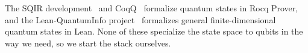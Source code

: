 %
%
%

The SQIR development~\cite{hietala2021} and CoqQ~\cite{coqq} formalize quantum
states in Rocq Prover, and the Lean-QuantumInfo project~\cite{leanquantuminfo}
formalizes general finite-dimensional quantum states in Lean. None of these
specialize the state space to qubits in the way we need, so we start the stack
ourselves.

